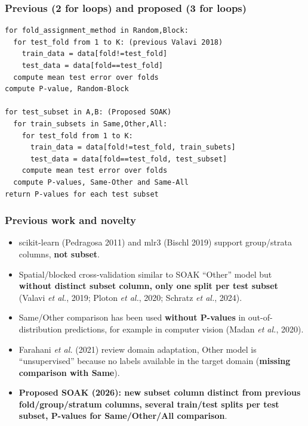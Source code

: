 \documentclass[t]{beamer}
\begin{document}
\begin{frame}[fragile]
  \frametitle{Previous (2 for loops) and proposed (3 for loops)}

\begin{verbatim}
for fold_assignment_method in Random,Block:
  for test_fold from 1 to K: (previous Valavi 2018)
    train_data = data[fold!=test_fold]
    test_data = data[fold==test_fold]
  compute mean test error over folds
compute P-value, Random-Block

for test_subset in A,B: (Proposed SOAK)
  for train_subsets in Same,Other,All:
    for test_fold from 1 to K:
      train_data = data[fold!=test_fold, train_subets]
      test_data = data[fold==test_fold, test_subset]
    compute mean test error over folds
  compute P-values, Same-Other and Same-All
return P-values for each test subset  
\end{verbatim}    
\end{frame}

\begin{frame}
  \frametitle{Previous work and novelty}
  \begin{itemize}
  \item scikit-learn (Pedragosa 2011) and mlr3 (Bischl 2019) support group/strata columns, \textbf{not subset}.
  \item Spatial/blocked cross-validation similar to SOAK ``Other'' model but \textbf{without distinct subset column, only one split per test subset}
    (Valavi \emph{et al.}, 2019; Ploton \emph{et al.}, 2020; Schratz \emph{et al.}, 2024).
  \item Same/Other comparison has been used \textbf{without P-values} in
    out-of-distribution predictions, for example in computer vision
    (Madan \emph{et al.}, 2020).
  \item Farahani \emph{et al.} (2021) review domain
      adaptation,
      Other model is ``unsupervised'' because no labels available in the target domain (\textbf{missing comparison with Same}).
  \item \textbf{Proposed SOAK (2026): new subset column distinct from previous fold/group/stratum columns, several train/test splits per test subset, P-values for Same/Other/All comparison}.
  \end{itemize}
\end{frame}
\end{document}
